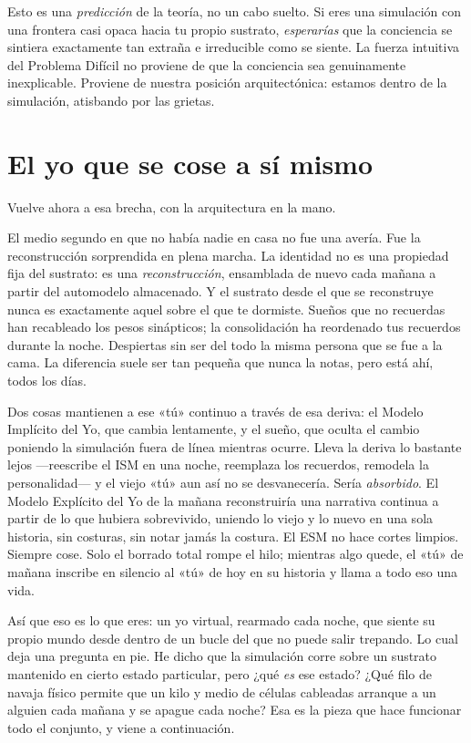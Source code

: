 \documentclass[11pt, twoside, openright]{book}
\begin{document}
Esto es una \textit{predicción} de la teoría, no un cabo suelto. Si eres una simulación con una frontera casi opaca hacia tu propio sustrato, \textit{esperarías} que la conciencia se sintiera exactamente tan extraña e irreducible como se siente. La fuerza intuitiva del Problema Difícil no proviene de que la conciencia sea genuinamente inexplicable. Proviene de nuestra posición arquitectónica: estamos dentro de la simulación, atisbando por las grietas.

\section*{El yo que se cose a sí mismo}

Vuelve ahora a esa brecha, con la arquitectura en la mano.

El medio segundo en que no había nadie en casa no fue una avería. Fue la reconstrucción sorprendida en plena marcha. La identidad no es una propiedad fija del sustrato: es una \textit{reconstrucción}, ensamblada de nuevo cada mañana a partir del automodelo almacenado. Y el sustrato desde el que se reconstruye nunca es exactamente aquel sobre el que te dormiste. Sueños que no recuerdas han recableado los pesos sinápticos; la consolidación ha reordenado tus recuerdos durante la noche. Despiertas sin ser del todo la misma persona que se fue a la cama. La diferencia suele ser tan pequeña que nunca la notas, pero está ahí, todos los días.

Dos cosas mantienen a ese «tú» continuo a través de esa deriva: el Modelo Implícito del Yo, que cambia lentamente, y el sueño, que oculta el cambio poniendo la simulación fuera de línea mientras ocurre. Lleva la deriva lo bastante lejos ---reescribe el ISM en una noche, reemplaza los recuerdos, remodela la personalidad--- y el viejo «tú» aun así no se desvanecería. Sería \textit{absorbido}. El Modelo Explícito del Yo de la mañana reconstruiría una narrativa continua a partir de lo que hubiera sobrevivido, uniendo lo viejo y lo nuevo en una sola historia, sin costuras, sin notar jamás la costura. El ESM no hace cortes limpios. Siempre cose. Solo el borrado total rompe el hilo; mientras algo quede, el «tú» de mañana inscribe en silencio al «tú» de hoy en su historia y llama a todo eso una vida.

Así que eso es lo que eres: un yo virtual, rearmado cada noche, que siente su propio mundo desde dentro de un bucle del que no puede salir trepando. Lo cual deja una pregunta en pie. He dicho que la simulación corre sobre un sustrato mantenido en cierto estado particular, pero ¿qué \textit{es} ese estado? ¿Qué filo de navaja físico permite que un kilo y medio de células cableadas arranque a un alguien cada mañana y se apague cada noche? Esa es la pieza que hace funcionar todo el conjunto, y viene a continuación.
\end{document}
